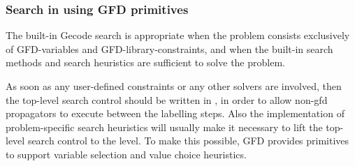 \subsubsection{Search in {\eclipse} using GFD primitives}
\label{searchgfd}
The built-in Gecode search is appropriate when the problem consists
exclusively of GFD-variables and GFD-library-constraints, and when the
built-in search methods and search heuristics are sufficient to solve
the problem.

As soon as any user-defined constraints or any other {\eclipse}
solvers are involved, then the top-level search control should be
written in \eclipse, in order to allow non-gfd propagators to execute
between the labelling steps.  Also the implementation of problem-specific
search heuristics will usually make it necessary to lift the top-level
search control to the {\eclipse} level.
To make this possible, GFD provides primitives to support variable 
selection and value choice heuristics.

